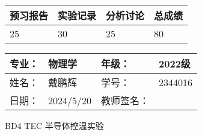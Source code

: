 \documentclass[dvipsnames, svgnames,a4paper,11pt]{article}
\begin{document}
\begin{table}
	\renewcommand\arraystretch{1.7}
	\begin{tabularx}{\textwidth}{
		|X|X|X|X
		|X|X|X|X|}
	\hline
	\multicolumn{2}{|c|}{预习报告}&\multicolumn{2}{|c|}{实验记录}&\multicolumn{2}{|c|}{分析讨论}&\multicolumn{2}{|c|}{总成绩}\\
	\hline
	\LARGE25 & & \LARGE30 & & \LARGE25 & & \LARGE80 & \\
	\hline
	\end{tabularx}
\end{table}


\begin{table}
	\renewcommand\arraystretch{1.7}
	\begin{tabularx}{\textwidth}{|X|X|X|X|}
	\hline
	专业：& 物理学 &年级：& 2022级\\
	\hline
	姓名：& 戴鹏辉  & 学号： & 2344016 \\
	\hline
	日期：& 2024/5/20 & 教师签名：& \\
	\hline
	\end{tabularx}
\end{table}

\begin{center}
	\LARGE BD4  \quad TEC 半导体控温实验
\end{center}
\end{document}
